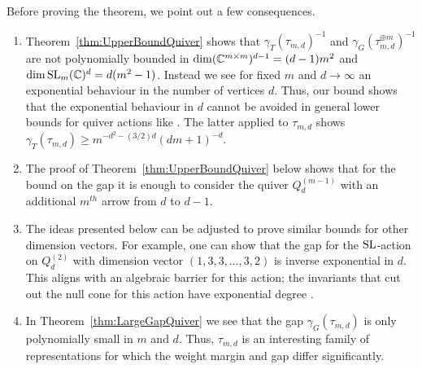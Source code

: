 \begin{remark} \label{rem:QuiverGapMargin}
	Before proving the theorem, we point out a few consequences.
	\begin{enumerate}
		\item Theorem~\ref{thm:UpperBoundQuiver} shows that $\gamma_{T}(\tau_{m,d})^{-1}$ and $\gamma_{G}(\tau_{m,d}^{\oplus m})^{-1}$ are not polynomially bounded in $\dim (\mathbb C^{m \times m})^{d-1} = (d-1)m^2$ and $\dim \operatorname{SL}_m(\mathbb C)^d = d(m^2 -1)$. Instead we see for fixed $m$ and $d \to \infty$ an exponential behaviour in the number of vertices $d$. Thus, our bound shows that the exponential behaviour in $d$ cannot be avoided in general lower bounds for quiver actions like \cite[Theorem~6.21 Item~4]{GradflowArXiv}. The latter applied to $\tau_{m,d}$ shows $\gamma_{T}(\tau_{m,d}) \geq m^{-d^2-(3/2)d}(dm+1)^{-d}$.
		
		\item The proof of Theorem~\ref{thm:UpperBoundQuiver} below shows that for the bound on the gap it is enough to consider the quiver $Q_d^{(m-1)}$ with an additional $m^{th}$ arrow from $d$ to $d-1$. 
		
		\item The ideas presented below can be adjusted to prove similar bounds for other dimension vectors. For example, one can show that the gap for the $\operatorname{SL}$-action on $Q_d^{(2)}$ with dimension vector $(1,3,3,\ldots,3,2)$ is inverse exponential in $d$. This aligns with an algebraic barrier for this action; the invariants that cut out the null cone for this action have exponential degree \cite[Proposition~1.5]{derksen2018degree}.
		
		\item In Theorem~\ref{thm:LargeGapQuiver} we see that the gap $\gamma_{G}(\tau_{m,d})$ is only polynomially small in $m$ and $d$. Thus, $\tau_{m,d}$ is an interesting family of representations for which the weight margin and gap differ significantly.
		\hfill\remSymbol
	\end{enumerate}
\end{remark}


